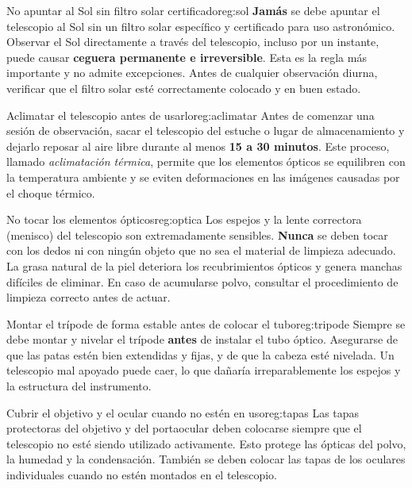 \begin{regla}{No apuntar al Sol sin filtro solar certificado}{reg:sol}
    \textbf{Jamás} se debe apuntar el telescopio al Sol sin un filtro solar específico
    y certificado para uso astronómico. Observar el Sol directamente a través del
    telescopio, incluso por un instante, puede causar \textbf{ceguera permanente e
    irreversible}. Esta es la regla más importante y no admite excepciones.
    Antes de cualquier observación diurna, verificar que el filtro solar esté
    correctamente colocado y en buen estado.
\end{regla}

\begin{regla}{Aclimatar el telescopio antes de usarlo}{reg:aclimatar}
    Antes de comenzar una sesión de observación, sacar el telescopio del estuche o
    lugar de almacenamiento y dejarlo reposar al aire libre durante al menos
    \textbf{15 a 30 minutos}. Este proceso, llamado \textit{aclimatación térmica},
    permite que los elementos ópticos se equilibren con la temperatura ambiente y se
    eviten deformaciones en las imágenes causadas por el choque térmico.
\end{regla}

\begin{regla}{No tocar los elementos ópticos}{reg:optica}
    Los espejos y la lente correctora (menisco) del telescopio son extremadamente
    sensibles. \textbf{Nunca} se deben tocar con los dedos ni con ningún objeto
    que no sea el material de limpieza adecuado. La grasa natural de la piel
    deteriora los recubrimientos ópticos y genera manchas difíciles de eliminar.
    En caso de acumularse polvo, consultar el procedimiento de limpieza correcto
    antes de actuar.
\end{regla}

\begin{regla}{Montar el trípode de forma estable antes de colocar el tubo}{reg:tripode}
    Siempre se debe montar y nivelar el trípode \textbf{antes} de instalar el tubo
    óptico. Asegurarse de que las patas estén bien extendidas y fijas, y de que la
    cabeza esté nivelada. Un telescopio mal apoyado puede caer, lo que dañaría
    irreparablemente los espejos y la estructura del instrumento.
\end{regla}

\begin{regla}{Cubrir el objetivo y el ocular cuando no estén en uso}{reg:tapas}
    Las tapas protectoras del objetivo y del portaocular deben colocarse siempre que
    el telescopio no esté siendo utilizado activamente. Esto protege las ópticas
    del polvo, la humedad y la condensación. También se deben colocar las tapas de
    los oculares individuales cuando no estén montados en el telescopio.
\end{regla}

